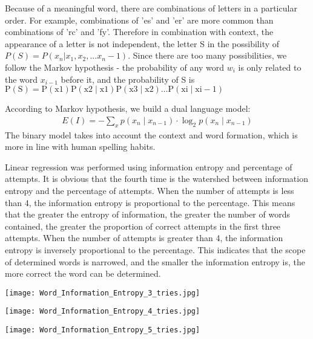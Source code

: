 \documentclass{mcmthesis}
\begin{document}
Because of a meaningful word, there are combinations of letters in a particular order. For example, combinations of 'es' and 'er' are more common than combinations of 'rc' and 'fy'. Therefore in combination with context, the appearance of a letter is not independent, the letter S in the possibility of $P (S) = P (x_n | x_1, x_2,... x_n- 1)$. Since there are too many possibilities, we follow the Markov hypothesis - the probability of any word $w_i$ is only related to the word $x_{i-1}$ before it, and the probability of S is $\mathrm{P}(\mathrm{S})=\mathrm{P}(\mathrm{x} 1) \mathrm{P}(\mathrm{x} 2 \mid \mathrm{x} 1) \mathrm{P}(\mathrm{x} 3 \mid \mathrm{x} 2) \ldots \mathrm{P}(\mathrm{xi} \mid \mathrm{xi}-1)$

According to Markov hypothesis, we build a dual language model:
\begin{eqnarray}
	E(I)  =  -\sum_{x} p\left(x_{n} \mid x_{n-1}\right) \cdot \log _{2} p\left(x_{n} \mid x_{n-1}\right)
\end{eqnarray}
The binary model takes into account the context and word formation, which is more in line with human spelling habits.

Linear regression was performed using information entropy and percentage of attempts. It is obvious that the fourth time is the watershed between information entropy and the percentage of attempts. When the number of attempts is less than 4, the information entropy is proportional to the percentage. This means that the greater the entropy of information, the greater the number of words contained, the greater the proportion of correct attempts in the first three attempts. When the number of attempts is greater than 4, the information entropy is inversely proportional to the percentage. This indicates that the scope of determined words is narrowed, and the smaller the information entropy is, the more correct the word can be determined.
\begin{figure*}[htbp] %
	\begin{minipage}[t]{0.33\linewidth} %
		\centering
		\texttt{[image: Word\_Information\_Entropy\_3\_tries.jpg]} %
		\label{fig1} %
	\end{minipage}%
	\begin{minipage}[t]{0.33\linewidth}
		\centering
		\texttt{[image: Word\_Information\_Entropy\_4\_tries.jpg]}
		\label{fig2}
	\end{minipage}%
	\begin{minipage}[t]{0.33\linewidth}
		\centering
		\texttt{[image: Word\_Information\_Entropy\_5\_tries.jpg]}
		\label{fig3}
	\end{minipage}
\end{figure*}
\end{document}
